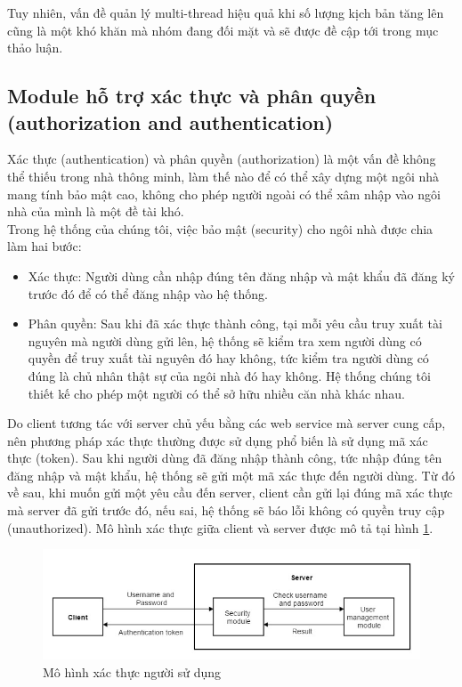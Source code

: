 \documentclass[12pt,a4paper,oneside]{extbook}
\begin{document}
\noindent
Tuy nhiên, vấn đề quản lý multi-thread hiệu quả khi số lượng kịch bản tăng lên cũng là một khó khăn mà nhóm đang đối mặt và sẽ được đề cập tới trong mục thảo luận.

\subsection{Module hỗ trợ xác thực và phân quyền (authorization and authentication)}

Xác thực (authentication) và phân quyền (authorization) là một vấn đề không thể thiếu trong nhà thông minh, làm thế nào để có thể xây dựng một ngôi nhà mang tính bảo mật cao, không cho phép người ngoài có thể xâm nhập vào ngôi nhà của mình là một đề tài khó.\\

\noindent
Trong hệ thống của chúng tôi, việc bảo mật (security) cho ngôi nhà được chia làm hai bước:

\begin{itemize}[topsep=1mm,itemsep=-0.5mm]
	\item Xác thực: Người dùng cần nhập đúng tên đăng nhập và mật khẩu đã đăng ký trước đó để có thể đăng nhập vào hệ thống.
	\item Phân quyền: Sau khi đã xác thực thành công, tại mỗi yêu cầu truy xuất tài nguyên mà người dùng gửi lên, hệ thống sẽ kiểm tra xem người dùng có quyền để truy xuất tài nguyên đó hay không, tức kiểm tra người dùng có đúng là chủ nhân thật sự của ngôi nhà đó hay không. Hệ thống chúng tôi thiết kế cho phép một người có thể sở hữu nhiều căn nhà khác nhau.
	\vspace{1mm}
	\end{itemize}
	
Do client tương tác với server chủ yếu bằng các web service mà server cung cấp, nên phương pháp xác thực thường được sử dụng phổ biến là sử dụng mã xác thực (token). Sau khi người dùng đã đăng nhập thành công, tức nhập đúng tên đăng nhập và mật khẩu, hệ thống sẽ gửi một mã xác thực đến người dùng. Từ đó về sau, khi muốn gửi một yêu cầu đến server, client cần gửi lại đúng mã xác thực mà server đã gửi trước đó, nếu sai, hệ thống sẽ báo lỗi không có quyền truy cập (unauthorized). Mô hình xác thực giữa client và server được mô tả tại hình \ref{fig:6-authentication}.\\

\begin{figure}[h]
  \centering
     \includegraphics[width=15cm]{6-authentication}
  \caption{Mô hình xác thực người sử dụng}\label{fig:6-authentication}
\end{figure}
\end{document}
